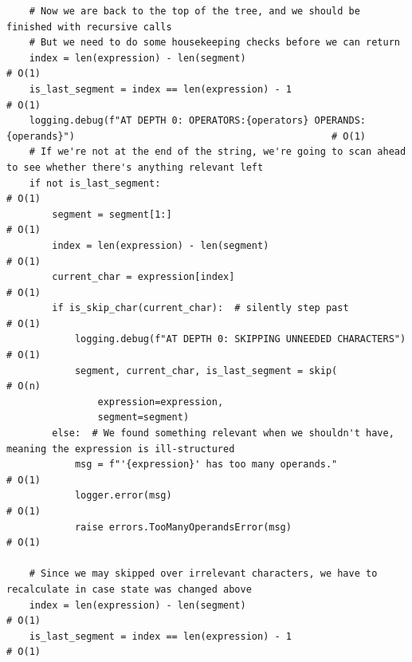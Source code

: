\documentclass[10pt,letterpaper,final]{report}
\begin{document}
\begin{verbatim}
    # Now we are back to the top of the tree, and we should be finished with recursive calls
    # But we need to do some housekeeping checks before we can return
    index = len(expression) - len(segment)                                                                              # O(1)
    is_last_segment = index == len(expression) - 1                                                                      # O(1)
    logging.debug(f"AT DEPTH 0: OPERATORS:{operators} OPERANDS:{operands}")                                             # O(1)
    # If we're not at the end of the string, we're going to scan ahead to see whether there's anything relevant left    
    if not is_last_segment:                                                                                             # O(1)
        segment = segment[1:]                                                                                           # O(1)
        index = len(expression) - len(segment)                                                                          # O(1)
        current_char = expression[index]                                                                                # O(1)
        if is_skip_char(current_char):  # silently step past                                                             # O(1)
            logging.debug(f"AT DEPTH 0: SKIPPING UNNEEDED CHARACTERS")                                                  # O(1)
            segment, current_char, is_last_segment = skip(                                                              # O(n)
                expression=expression,                                                                                  
                segment=segment)                                                                                        
        else:  # We found something relevant when we shouldn't have, meaning the expression is ill-structured           
            msg = f"'{expression}' has too many operands."                                                              # O(1)
            logger.error(msg)                                                                                           # O(1)
            raise errors.TooManyOperandsError(msg)                                                                      # O(1)
                                                                                                                        
    # Since we may skipped over irrelevant characters, we have to recalculate in case state was changed above           
    index = len(expression) - len(segment)                                                                              # O(1)
    is_last_segment = index == len(expression) - 1                                                                      # O(1)
                                                                                                                        

\end{verbatim}
\end{document}
